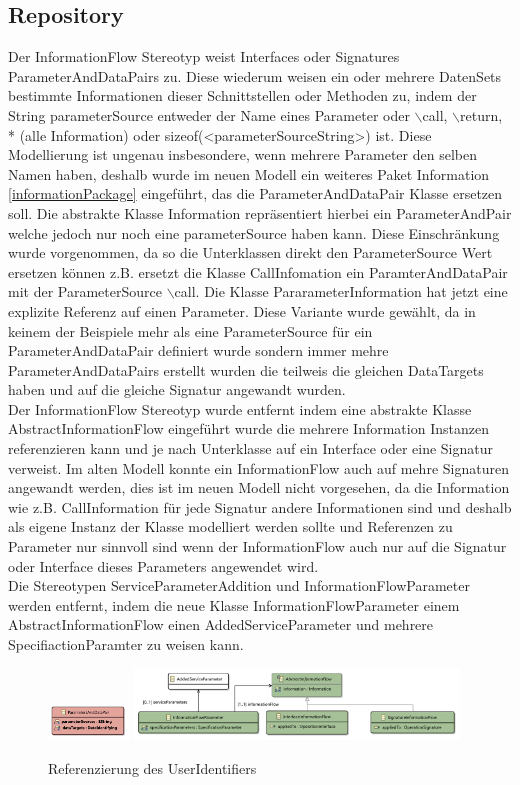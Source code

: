 \documentclass[twoside, ngerman]{sdqseminar}
\begin{document}
\subsection{Repository}
Der InformationFlow Stereotyp weist Interfaces oder Signatures ParameterAndDataPairs zu. Diese wiederum weisen ein oder mehrere DatenSets bestimmte Informationen dieser Schnittstellen oder Methoden zu, indem der String parameterSource entweder der Name eines Parameter oder $\backslash$call, $\backslash$return, * (alle Information) oder sizeof(<parameterSourceString>) ist. Diese Modellierung ist ungenau insbesondere, wenn mehrere Parameter den selben Namen haben, deshalb wurde im neuen Modell ein weiteres Paket Information \ref{informationPackage} eingeführt, das die ParameterAndDataPair Klasse ersetzen soll. Die abstrakte Klasse Information repräsentiert hierbei ein ParameterAndPair welche jedoch nur noch eine parameterSource haben kann. Diese Einschränkung wurde vorgenommen, da so die Unterklassen direkt den ParameterSource Wert ersetzen können z.B. ersetzt die Klasse CallInfomation ein ParamterAndDataPair mit der ParameterSource $\backslash$call. Die Klasse PararameterInformation  hat jetzt eine explizite Referenz auf einen Parameter. Diese Variante wurde gewählt, da in keinem der Beispiele mehr als eine ParameterSource für ein ParameterAndDataPair definiert wurde sondern immer mehre ParameterAndDataPairs erstellt wurden die teilweis die gleichen DataTargets haben und auf die gleiche Signatur angewandt wurden. \\
Der InformationFlow Stereotyp wurde entfernt indem eine abstrakte Klasse AbstractInformationFlow eingeführt wurde die mehrere Information Instanzen referenzieren kann und je nach Unterklasse auf ein Interface oder eine Signatur verweist. Im alten Modell konnte ein InformationFlow auch auf mehre Signaturen angewandt werden, dies ist im neuen Modell nicht vorgesehen, da die Information wie z.B. CallInformation für jede Signatur andere Informationen sind und deshalb als eigene Instanz der Klasse modelliert werden sollte und Referenzen zu Parameter nur sinnvoll sind wenn der InformationFlow auch nur auf die Signatur oder Interface dieses Parameters angewendet wird. \\
Die Stereotypen ServiceParameterAddition und InformationFlowParameter werden entfernt, indem die neue Klasse InformationFlowParameter einem AbstractInformationFlow einen AddedServiceParameter und mehrere SpecifiactionParamter zu weisen kann.
\begin{figure}[htbp]
	\label{repositoryPackage}
	\centering
	\includegraphics[width=0.19\textwidth]{images/old/repository.pdf}
	\includegraphics[width=0.77\textwidth]{images/new/repository.pdf}
	\caption{Referenzierung des UserIdentifiers}
\end{figure}
\end{document}

